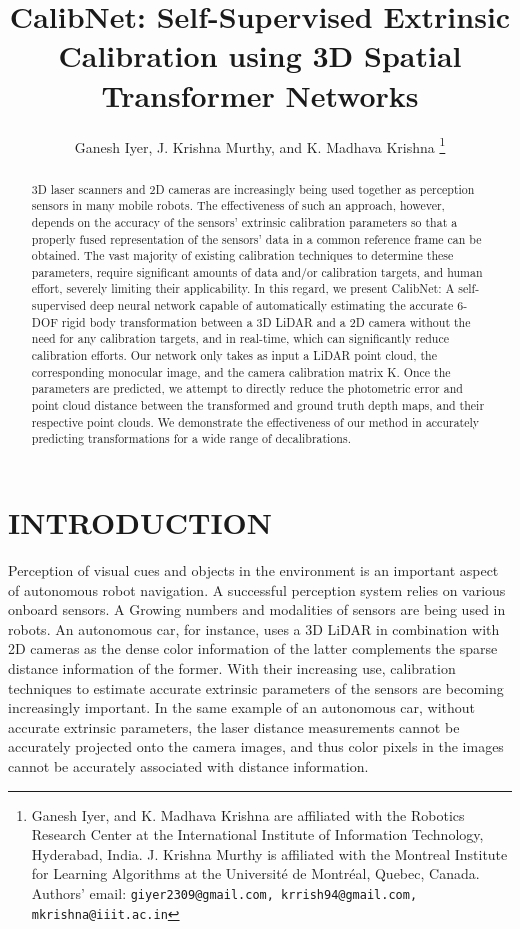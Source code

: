 \documentclass[letterpaper, 10 pt, conference]{ieeeconf}  %
\title{\LARGE \bf
CalibNet: Self-Supervised Extrinsic Calibration using 3D Spatial Transformer Networks
}
\author{Ganesh Iyer, J. Krishna Murthy, and K. Madhava Krishna%
\thanks{Ganesh Iyer, and K. Madhava Krishna are affiliated with the Robotics Research Center at the International Institute of Information Technology, Hyderabad, India.
        J. Krishna Murthy is affiliated with the Montreal Institute for Learning Algorithms at the Universit\'e de Montr\'eal, Quebec, Canada.
        Authors' email: \tt{\small{giyer2309@gmail.com, krrish94@gmail.com, mkrishna@iiit.ac.in}}}%
}
\begin{document}
\maketitle
\thispagestyle{empty}
\pagestyle{empty}


\begin{abstract}

3D laser scanners and 2D cameras are increasingly being used together as perception sensors in many mobile robots. The effectiveness
of such an approach, however, depends on the accuracy of the sensors' extrinsic calibration parameters
so that a properly fused representation of the sensors' data in a common reference frame can be obtained. The vast majority of existing calibration
techniques to determine these parameters, require significant amounts of data and/or calibration targets, and human effort, severely limiting their applicability.
In this regard, we present CalibNet: A self-supervised deep neural network capable of automatically estimating the accurate 6-DOF rigid body transformation between a 3D LiDAR and a 2D camera without
the need for any calibration targets, and in real-time, which can significantly reduce calibration efforts. Our network only takes as input a LiDAR point cloud, the corresponding monocular image, and the camera calibration matrix K. Once the parameters are predicted, we attempt to directly reduce the photometric error and point cloud distance between the transformed and ground truth depth maps, and their respective point clouds. We demonstrate the effectiveness of our method in accurately predicting transformations for a wide range of decalibrations. 

\end{abstract}



\section{INTRODUCTION}

Perception of visual cues and objects in the environment is an important aspect of autonomous robot navigation. A successful perception system relies on various onboard sensors. A Growing numbers and modalities of sensors are being used in robots. An autonomous car, for instance, uses a 3D LiDAR
in combination with 2D cameras as the dense color information of the latter complements the sparse distance information of the former.
With their increasing use, calibration techniques to estimate accurate extrinsic parameters of the sensors are becoming increasingly important. In the same example of an autonomous car,
without accurate extrinsic parameters, the laser distance measurements cannot be accurately projected onto the camera images, and thus color pixels
in the images cannot be accurately associated with distance information. 
\end{document}
